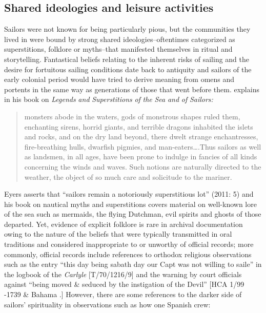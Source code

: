 \subsection{\textbf{Shared} \textbf{ideologies} \textbf{and} \textbf{leisure} \textbf{activities}}%

  Sailors were not known for being particularly pious, but the communities they lived in were bound by strong shared ideologies--oftentimes categorized as superstitions, folklore or myths--that manifested themselves in ritual and storytelling. Fantastical beliefs relating to the inherent risks of sailing and the desire for fortuitous sailing conditions date back to antiquity and sailors of the early colonial period would have tried to derive meaning from omens and portents in the same way as generations of those that went before them. \citet{Bassett1885} explains in his book on \textit{Legends} \textit{and} \textit{Superstitions} \textit{of} \textit{the} \textit{Sea} \textit{and} \textit{of} \textit{Sailors:}

\begin{quotation}
monsters abode in the waters, gods of monstrous shapes ruled them, enchanting sirens, horrid giants, and terrible dragons inhabited the islets and rocks, and on the dry land beyond, there dwelt strange enchantresses, fire-breathing hulls, dwarfish pigmies, and man-eaters….Thus sailors as well as landsmen, in all ages, have been prone to indulge in fancies of all kinds concerning the winds and waves. Such notions are naturally directed to the weather, the object of so much care and solicitude to the mariner. \citep[12]{Bassett1885}\end{quotation}

Eyers asserts that “sailors remain a notoriously superstitious lot” (2011: 5) and his book on nautical myths and superstitions covers material on well-known lore of the sea such as mermaids, the flying Dutchman, evil spirits and ghosts of those departed. Yet, evidence of explicit folklore is rare in archival documentation owing to the nature of the beliefs that were typically transmitted in oral traditions and considered inappropriate to or unworthy of official records; more commonly, official records include references to orthodox religious observations such as the entry “this day being sabath day our Capt was not willing to saile” in the logbook of the \textit{Carlyle} [T/70/1216/9] and the warning by court officials against “being moved \& seduced by the instigation of the Devil” [HCA 1/99 \citealt{Jamaica1738}-1739 \& Bahama \citealt{Islands1722}.] However, there are some references to the darker side of sailors’ spirituality in observations such as how one Spanish crew: 

